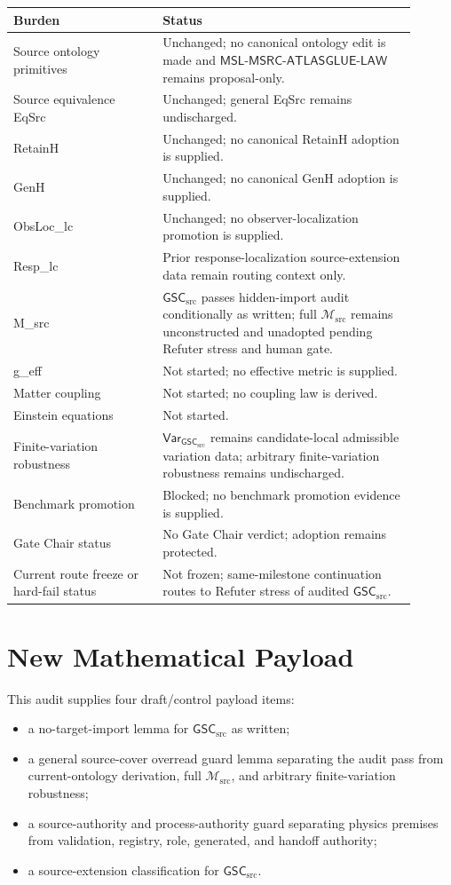 \documentclass[11pt]{article}
\newcommand{\Msrc}{\mathcal{M}_{\mathrm{src}}}
\newcommand{\MSL}{\mathsf{MSL}\mbox{-}\mathsf{MSRC}\mbox{-}\mathsf{ATLASGLUE}\mbox{-}\mathsf{LAW}}
\newcommand{\GSC}{\mathsf{GSC}_{\mathrm{src}}}
\newcommand{\Vargsc}{\mathsf{Var}_{\GSC}}
\begin{document}
\begin{center}
\begin{tabular}{p{0.33\linewidth}p{0.57\linewidth}}
\hline
Burden & Status \\
\hline
Source ontology primitives & Unchanged; no canonical ontology edit is made and \(\MSL\) remains proposal-only. \\
Source equivalence EqSrc & Unchanged; general EqSrc remains undischarged. \\
RetainH & Unchanged; no canonical RetainH adoption is supplied. \\
GenH & Unchanged; no canonical GenH adoption is supplied. \\
ObsLoc\_lc & Unchanged; no observer-localization promotion is supplied. \\
Resp\_lc & Prior response-localization source-extension data remain routing context only. \\
M\_src & \(\GSC\) passes hidden-import audit conditionally as written; full \(\Msrc\) remains unconstructed and unadopted pending Refuter stress and human gate. \\
g\_eff & Not started; no effective metric is supplied. \\
Matter coupling & Not started; no coupling law is derived. \\
Einstein equations & Not started. \\
Finite-variation robustness & \(\Vargsc\) remains candidate-local admissible variation data; arbitrary finite-variation robustness remains undischarged. \\
Benchmark promotion & Blocked; no benchmark promotion evidence is supplied. \\
Gate Chair status & No Gate Chair verdict; adoption remains protected. \\
Current route freeze or hard-fail status & Not frozen; same-milestone continuation routes to Refuter stress of audited \(\GSC\). \\
\hline
\end{tabular}
\end{center}

\section{New Mathematical Payload}

This audit supplies four draft/control payload items:
\begin{itemize}
  \item a no-target-import lemma for \(\GSC\) as written;
  \item a general source-cover overread guard lemma separating the audit pass
  from current-ontology derivation, full \(\Msrc\), and arbitrary
  finite-variation robustness;
  \item a source-authority and process-authority guard separating physics
  premises from validation, registry, role, generated, and handoff authority;
  \item a source-extension classification for \(\GSC\).
\end{itemize}
\end{document}

